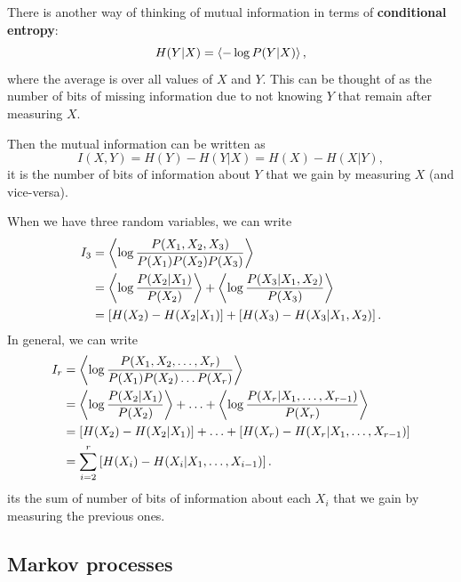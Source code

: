 \documentclass[12pt]{article}
\begin{document}
There is another way of thinking of mutual information in terms of \textbf{conditional entropy}:
%
\begin{equation}\label{eq:condent}
  H(Y|X) = \left\langle -\log P(Y|X) \right\rangle,
\end{equation}
%
where the average is over all values of $X$ and $Y$. This can be thought of as the number of bits of missing information due to not knowing $Y$ that remain after measuring $X$.

Then the mutual information can be written as
%
\begin{equation}\label{eq:mutinfcond}
  I(X,Y) = H(Y) - H(Y|X) = H(X) - H(X|Y),
\end{equation}
%
\ie it is the number of bits of information about $Y$ that we gain by measuring $X$ (and vice-versa).

When we have three random variables, we can write
%
\begin{equation}\label{eq:multiinfcond3}
  \begin{aligned}
    I_3 &= \left\langle \log \frac{P(X_1,X_2,X_3)}{P(X_1)P(X_2)P(X_3)} \right\rangle \\
      &=  \left\langle \log \frac{P(X_2 \vert X_1)}{P(X_2)} \right\rangle + \left\langle \log \frac{P(X_3 \vert X_1,X_2)}{P(X_3)} \right\rangle \\
      &= \left [ H(X_2)-H(X_2|X_1) \right ] +  \left [  H(X_3)-H(X_3|X_1,X_2) \right ].
  \end{aligned}
\end{equation}
%
In general, we can write
%
\begin{equation}\label{eq:multiinfcondgen}
  \begin{aligned}
    I_r &= \left\langle \log \frac{P(X_1,X_2,\ldots,X_r)}{P(X_1)P(X_2)\ldots P(X_r)} \right\rangle \\
      &=  \left\langle \log \frac{P(X_2 \vert X_1)}{P(X_2)} \right\rangle +\ldots+ \left\langle \log \frac{P(X_r \vert X_1,\ldots,X_{r-1})}{P(X_r)} \right\rangle \\
      &= \left [ H(X_2)-H(X_2|X_1) \right ] + \ldots + \left [  H(X_r)-H(X_r|X_1,\ldots,X_{r-1}) \right ] \\
      &= \sum_{i=2}^{r} \left [  H(X_i)-H(X_i|X_1,\ldots,X_{i-1}) \right ].
  \end{aligned}
\end{equation}
%
\ie its the sum of number of bits of information about each $X_i$ that we gain by measuring the previous ones.


\subsection{Markov processes}\label{sec:markov}
\end{document}
